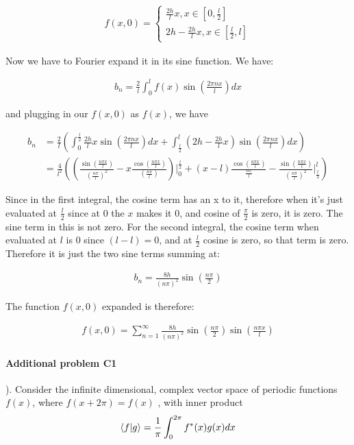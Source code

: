 \documentclass{article}
\begin{document}
\begin{align*}
f(x,0) = \begin{cases}
\frac{2h}{l}x, x \in [0, \frac{l}{2}] \\
2h-\frac{2h}{l}x, x \in [\frac{l}{2}, l]
\end{cases}
\end{align*}

Now we have to Fourier expand it in its sine function. We have:

\begin{align*}
b_n = \frac{2}{l} \int_{0}^{l} f(x) \sin(\frac{2 \pi n x}{l}) dx
\end{align*}

and plugging in our $f(x,0)$ as $f(x)$, we have

\begin{align*}
b_n &= \frac{2}{l} ( \int_{0}^{\frac{l}{2}} \frac{2h}{l}x \sin(\frac{2 \pi n x}{l}) dx + \int_{\frac{l}{2}}^{l}  (2h-\frac{2h}{l}x) \sin(\frac{2 \pi n x}{l}) dx) \\
&= \frac{4}{l^2} ((\frac{\sin(\frac{n \pi x}{l})}{(\frac{n \pi}{l})^2} - x \frac{\cos{(\frac{n \pi x}{l})}}{(\frac{n \pi}{l})}) \Big|^{\frac{l}{2}}_{0} + (x-l) \frac{\cos(\frac{n \pi x}{l})}{\frac{n \pi}{l}} - \frac{\sin(\frac{n \pi x}{l})}{(\frac{n \pi}{l})^2} \Big|^{l}_{\frac{l}{2}})
\end{align*}

Since in the first integral, the cosine term has an x to it, therefore when it's just evaluated at $\frac{l}{2}$ since at 0 the $x$ makes it 0, and cosine of $\frac{\pi}{2}$ is zero, it is zero. The sine term in this is not zero. For the second integral, the cosine term when evaluated at $l$ is 0 since $(l-l)=0$, and at $\frac{l}{2}$ cosine is zero, so that term is zero. Therefore it is just the two sine terms summing at:

\begin{align*}
b_n = \frac{8h}{(n \pi)^2} \sin{(\frac{n \pi}{2})}
\end{align*}

The function $f(x,0)$ expanded is therefore:

\begin{align*}
f(x,0) = \sum_{n=1}^{\infty} \frac{8h}{(n \pi)^2} \sin{(\frac{n \pi}{2})} \sin{(\frac{n \pi x}{l})}
\end{align*}


\paragraph{Additional problem C1}
). Consider the infinite dimensional, complex vector space of periodic functions $f(x)$,
where $f(x+ 2\pi) = f(x)$ , with inner product
\begin{align*}
\bra{f}\ket{g} = \frac{1}{\pi} \int_{0}^{2\pi} f^*(x) g(x) dx
\end{align*}
\end{document}
